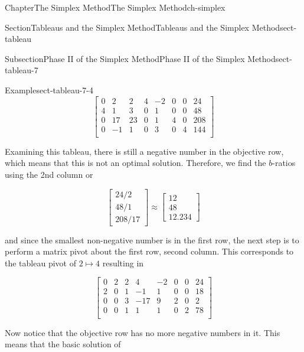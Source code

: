 \documentclass[oneside,10pt,]{book}
\numberwithin{equation}{section}
\newcommand{\amp}{&}
\begin{document}
\begin{chapterptx}{Chapter}{The Simplex Method}{}{The Simplex Method}{}{}{ch-simplex}
\begin{sectionptx}{Section}{Tableaus and the Simplex Method}{}{Tableaus and the Simplex Method}{}{}{sect-tableau}
\begin{subsectionptx}{Subsection}{Phase II of the Simplex Method}{}{Phase II of the Simplex Method}{}{}{sect-tableau-7}
\begin{example}{Example}{}{sect-tableau-7-4}
\begin{equation*}
\left[\begin{array}{rrr|rrrr|r} 0 \amp 2 \amp 2 \amp 4 \amp -2 \amp 0 \amp 0 \amp 24\\ 4 \amp 1 \amp 3 \amp 0 \amp 1 \amp 0 \amp 0 \amp 48\\ 0 \amp 17 \amp 23 \amp 0 \amp 1 \amp 4 \amp 0 \amp 208\\ \hline 0 \amp -1 \amp 1 \amp 0 \amp 3 \amp 0 \amp 4 \amp 144\\ \end{array} \right]
\end{equation*}
%
\par
Examining this tableau, there is still a negative number in the objective row, which means that this is not an optimal solution. Therefore, we find the \(b\)-ratios using the 2nd column or%
\par
%
\begin{equation*}
\begin{bmatrix} 24/2 \\ 48/ 1 \\ 208/17 \end{bmatrix} \approx \begin{bmatrix} 12 \\ 48 \\12.234 \end{bmatrix}
\end{equation*}
%
\par
and since the smallest non-negative number is in the first row, the next step is to perform a matrix pivot about the first row, second column. This corresponds to the tableau pivot of \(2 \mapsto 4\) resulting in%
\par
%
\begin{equation*}
\left[\begin{array}{rrr|rrrr|r} 0 \amp 2 \amp 2 \amp 4 \amp -2 \amp 0 \amp 0 \amp 24\\ 2 \amp 0 \amp 1 \amp -1 \amp 1 \amp 0 \amp 0 \amp 18\\ 0 \amp 0 \amp 3 \amp -17 \amp 9 \amp 2 \amp 0 \amp 2\\ \hline 0 \amp 0 \amp 1 \amp 1 \amp 1 \amp 0 \amp 2 \amp 78\\ \end{array} \right]
\end{equation*}
%
\par
Now notice that the objective row has no more negative numbers in it. This means that the basic solution of%
\par
%
\begin{equation*}

\end{equation*}
\end{example}
\end{subsectionptx}
\end{sectionptx}
\end{chapterptx}
\end{document}
